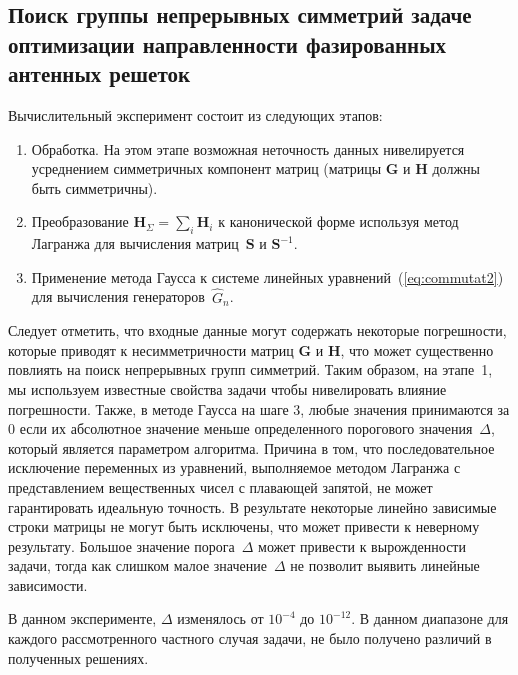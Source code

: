 \documentclass{llncs}
\begin{document}
\subsection*{Поиск группы непрерывных симметрий  задаче оптимизации направленности фазированных антенных решеток}\label{sec:sym:exp}

Вычислительный эксперимент состоит из следующих этапов:
\begin{enumerate}
  \item Обработка. На этом этапе возможная неточность данных нивелируется усреднением симметричных компонент матриц (матрицы $\textbf{G}$ и $\textbf{H}$ должны быть симметричны).
  \item %
  Преобразование $ {\textbf{H}}_{\Sigma} = \sum_{i} \textbf{H}_i$ к канонической форме используя метод Лагранжа для вычисления матриц~$\textbf{S}$ и $\textbf{S}^{-1} $.
  \item Применение метода Гаусса к системе линейных уравнений~(\ref{eq:commutat2}) для вычисления генераторов~$\hat{G}_n$.
\end{enumerate}

Следует отметить, что входные данные могут содержать некоторые погрешности, которые приводят к несимметричности матриц $\textbf{G}$ и $\textbf{H}$, что может существенно повлиять на поиск непрерывных групп симметрий. Таким образом, на этапе~1, мы используем известные свойства задачи чтобы нивелировать влияние погрешности.
Также, в методе Гаусса на шаге 3, любые значения принимаются за 0 если их абсолютное значение меньше определенного порогового значения~$\Delta$, который является параметром алгоритма. Причина в том, что последовательное исключение переменных из уравнений, выполняемое методом Лагранжа с представлением вещественных чисел с плавающей запятой, не может гарантировать идеальную точность.
В результате некоторые линейно зависимые строки матрицы не могут быть исключены, что может привести к неверному результату.
Большое значение порога~$\Delta$ может привести к вырожденности задачи, тогда как слишком малое значение~$\Delta$ не позволит выявить линейные зависимости.

В данном эксперименте, $\Delta$ изменялось от $ 10^{-4} $ до $ 10^{-12} $. В данном диапазоне для каждого рассмотренного частного случая задачи, не было получено различий в полученных решениях.

\end{document}
